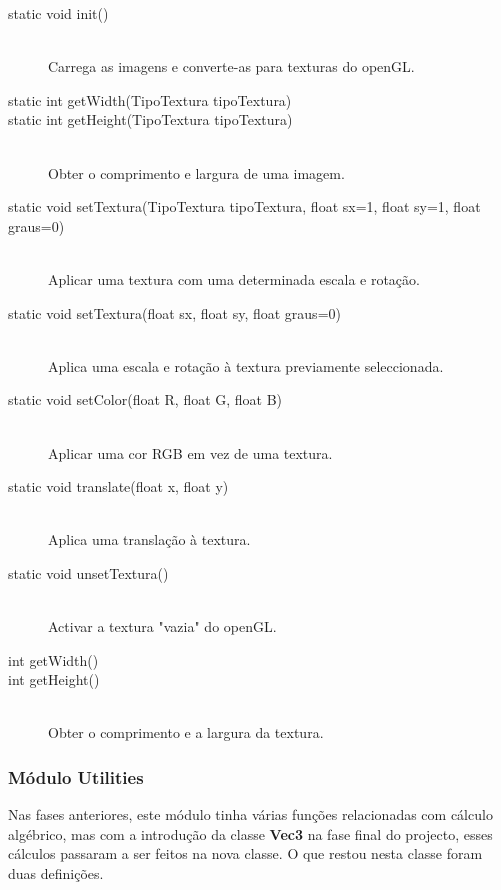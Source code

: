 \documentclass[a5paper,onecolumn, 11pt]{article}
\begin{document}
\begin{description}
	\item[static void init()] \hfill \\
	Carrega as imagens e converte-as para texturas do openGL.

	\item[static int getWidth(TipoTextura tipoTextura)]
	\item[static int getHeight(TipoTextura tipoTextura)] \hfill \\
	Obter o comprimento e largura de uma imagem.

	\item[static void setTextura(TipoTextura tipoTextura, float sx=1, float sy=1, float graus=0)] \hfill \\
	Aplicar uma textura com uma determinada escala e rotação.

	\item[static void setTextura(float sx, float sy, float graus=0)] \hfill \\
	Aplica uma escala e rotação à textura previamente seleccionada.

	\item[static void setColor(float R, float G, float B)] \hfill \\
	Aplicar uma cor RGB em vez de uma textura.

	\item[static void translate(float x, float y)] \hfill \\
	Aplica uma translação à textura.

	\item[static void unsetTextura()] \hfill \\
	Activar a textura "vazia" do openGL.

	\item[int getWidth()]
	\item[int getHeight()] \hfill \\
	Obter o comprimento e a largura da textura.
\end{description}

\clearpage
\subsubsection{Módulo Utilities} \label{modulo utilities}
Nas fases anteriores, este módulo tinha várias funções relacionadas com cálculo algébrico, mas com a introdução da classe \textbf{Vec3} na fase final do projecto, esses cálculos passaram a ser feitos na nova classe. O que restou nesta classe foram duas definições.
\end{document}
